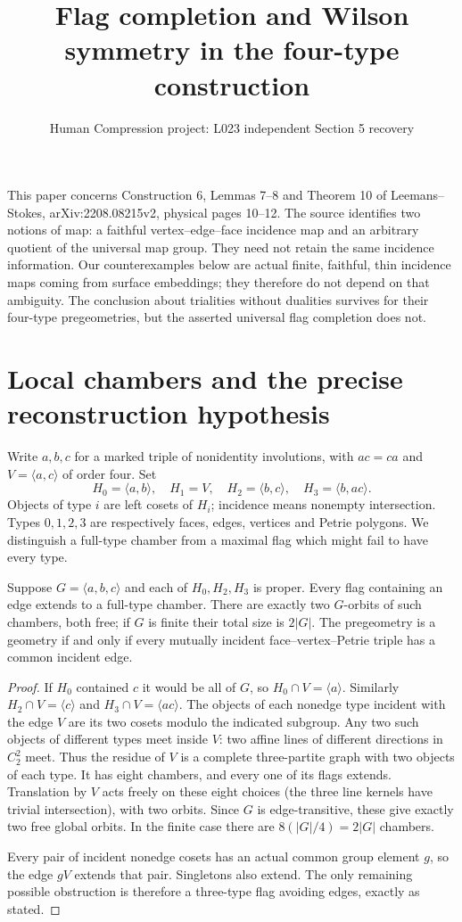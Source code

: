 \documentclass[11pt,a4paper]{article}
\title{Flag completion and Wilson symmetry in the four-type construction}
\author{Human Compression project: L023 independent Section 5 recovery}\date{}
\newcommand{\gen}[1]{\langle#1\rangle}\newcommand{\F}{\mathbb F}\newcommand{\Aut}{\operatorname{Aut}}
\begin{document}
\maketitle

This paper concerns Construction 6, Lemmas 7--8 and Theorem 10 of
Leemans--Stokes, arXiv:2208.08215v2, physical pages 10--12. The source
identifies two notions of map: a faithful vertex--edge--face incidence
map and an arbitrary quotient of the universal map group. They need not
retain the same incidence information. Our counterexamples below are
actual finite, faithful, thin incidence maps coming from surface embeddings;
they therefore do not depend on that ambiguity. The conclusion about
trialities without dualities survives for their four-type pregeometries,
but the asserted universal flag completion does not.

\section{Local chambers and the precise reconstruction hypothesis}

Write $a,b,c$ for a marked triple of nonidentity involutions, with
$ac=ca$ and $V=\gen{a,c}$ of order four. Set
\[
 H_0=\gen{a,b},\quad H_1=V,\quad H_2=\gen{b,c},
 \quad H_3=\gen{b,ac}.
\]
Objects of type $i$ are left cosets of $H_i$; incidence means nonempty
intersection. Types $0,1,2,3$ are respectively faces, edges, vertices
and Petrie polygons. We distinguish a full-type chamber from a maximal
flag which might fail to have every type.

\begin{lemma}\label{local}
Suppose $G=\gen{a,b,c}$ and each of $H_0,H_2,H_3$ is
proper. Every flag containing an edge extends to a full-type chamber.
There are exactly two $G$-orbits of such chambers, both free; if $G$
is finite their total size is $2|G|$. The
pregeometry is a geometry if and only if every mutually incident
face--vertex--Petrie triple has a common incident edge.
\end{lemma}
\begin{proof}
If $H_0$ contained $c$ it would be all of $G$, so
$H_0\cap V=\gen a$. Similarly $H_2\cap V=\gen c$ and
$H_3\cap V=\gen{ac}$. The objects of each nonedge type incident
with the edge $V$ are its two cosets modulo the indicated subgroup.
Any two such objects of different types meet inside $V$: two affine
lines of different directions in $C_2^2$ meet. Thus the residue of
$V$ is a complete three-partite graph with two objects of each type.
It has eight chambers, and every one of its flags extends. Translation
by $V$ acts freely on these eight choices (the three line kernels have
trivial intersection), with two orbits. Since $G$ is edge-transitive,
these give exactly two free global orbits. In the finite case there
are $8(|G|/4)=2|G|$ chambers.

Every pair of incident nonedge cosets has an actual common group
element $g$, so the edge $gV$ extends that pair. Singletons also
extend. The only remaining possible obstruction is therefore a
three-type flag avoiding edges, exactly as stated.
\end{proof}
\end{document}
